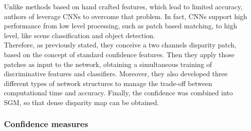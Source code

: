 Unlike methods based on hand crafted features, which lead to limited accuracy, authors of \cite{Seki2016} leverage CNNs to overcome that problem. 
In fact, CNNs support high performance from low level processing, such as patch based matching, to high level, like scene classification and object detection. \\
Therefore, as previously stated, they conceive a two channels disparity patch, based on the concept of standard confidence features.
Then they apply those patches as input to the network, obtaining a simultaneous training of discriminative features and classifiers.
Moreover, they also developed three different types of network structures to manage the trade-off between computational time and accuracy. 
Finally, the confidence was combined into SGM, so that dense disparity map can be obtained.

\subsubsection{Confidence measures}
\label{subsection:conf-measure}

